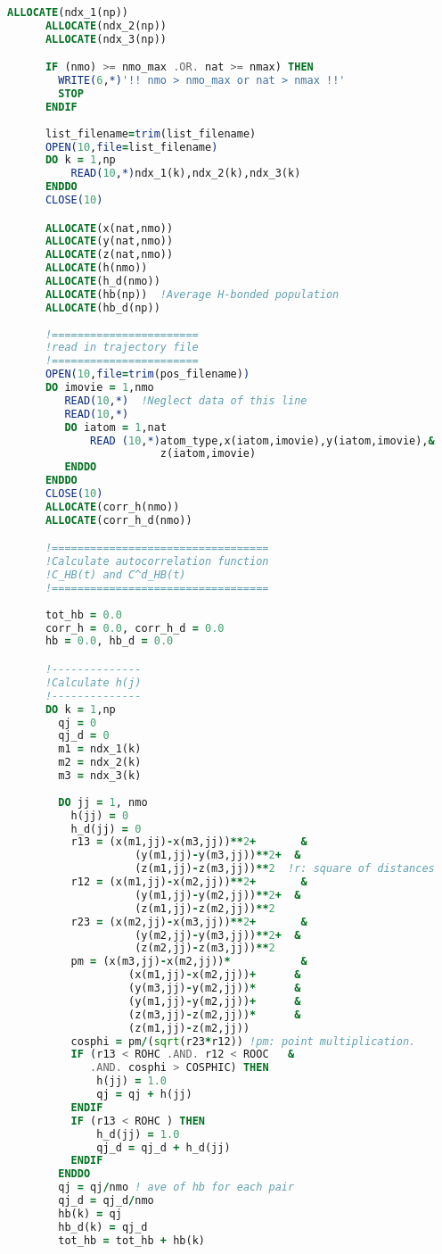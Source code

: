 \begin{lstlisting}[language=fortran]
      ALLOCATE(ndx_1(np))          
      ALLOCATE(ndx_2(np))          
      ALLOCATE(ndx_3(np))          

      IF (nmo) >= nmo_max .OR. nat >= nmax) THEN
        WRITE(6,*)'!! nmo > nmo_max or nat > nmax !!'
        STOP
      ENDIF
      
      list_filename=trim(list_filename)
      OPEN(10,file=list_filename)     
      DO k = 1,np
          READ(10,*)ndx_1(k),ndx_2(k),ndx_3(k)
      ENDDO
      CLOSE(10)

      ALLOCATE(x(nat,nmo))
      ALLOCATE(y(nat,nmo))
      ALLOCATE(z(nat,nmo))
      ALLOCATE(h(nmo))
      ALLOCATE(h_d(nmo))
      ALLOCATE(hb(np))  !Average H-bonded population 
      ALLOCATE(hb_d(np))
      
      !=======================
      !read in trajectory file 
      !=======================
      OPEN(10,file=trim(pos_filename))     
      DO imovie = 1,nmo
         READ(10,*)  !Neglect data of this line
         READ(10,*)                 
         DO iatom = 1,nat
             READ (10,*)atom_type,x(iatom,imovie),y(iatom,imovie),&
                        z(iatom,imovie)
         ENDDO
      ENDDO
      CLOSE(10)
      ALLOCATE(corr_h(nmo))
      ALLOCATE(corr_h_d(nmo))

      !==================================
      !Calculate autocorrelation function
      !C_HB(t) and C^d_HB(t)  
      !==================================
      
      tot_hb = 0.0
      corr_h = 0.0, corr_h_d = 0.0
      hb = 0.0, hb_d = 0.0

      !--------------
      !Calculate h(j)
      !--------------
      DO k = 1,np
        qj = 0
        qj_d = 0
        m1 = ndx_1(k)
        m2 = ndx_2(k)
        m3 = ndx_3(k)
        
        DO jj = 1, nmo
          h(jj) = 0
          h_d(jj) = 0 
          r13 = (x(m1,jj)-x(m3,jj))**2+       &
                    (y(m1,jj)-y(m3,jj))**2+  &
                    (z(m1,jj)-z(m3,jj))**2  !r: square of distances
          r12 = (x(m1,jj)-x(m2,jj))**2+       &
                    (y(m1,jj)-y(m2,jj))**2+  &
                    (z(m1,jj)-z(m2,jj))**2
          r23 = (x(m2,jj)-x(m3,jj))**2+       &
                    (y(m2,jj)-y(m3,jj))**2+  &
                    (z(m2,jj)-z(m3,jj))**2
          pm = (x(m3,jj)-x(m2,jj))*           &
                   (x(m1,jj)-x(m2,jj))+      & 
                   (y(m3,jj)-y(m2,jj))*      & 
                   (y(m1,jj)-y(m2,jj))+      & 
                   (z(m3,jj)-z(m2,jj))*      &
                   (z(m1,jj)-z(m2,jj)) 
          cosphi = pm/(sqrt(r23*r12)) !pm: point multiplication.
          IF (r13 < ROHC .AND. r12 < ROOC   & 
             .AND. cosphi > COSPHIC) THEN    
              h(jj) = 1.0 
              qj = qj + h(jj)                          
          ENDIF
          IF (r13 < ROHC ) THEN                           
              h_d(jj) = 1.0
              qj_d = qj_d + h_d(jj)                          
          ENDIF
        ENDDO   
        qj = qj/nmo ! ave of hb for each pair 
        qj_d = qj_d/nmo
        hb(k) = qj
        hb_d(k) = qj_d
        tot_hb = tot_hb + hb(k)


\end{lstlisting}
